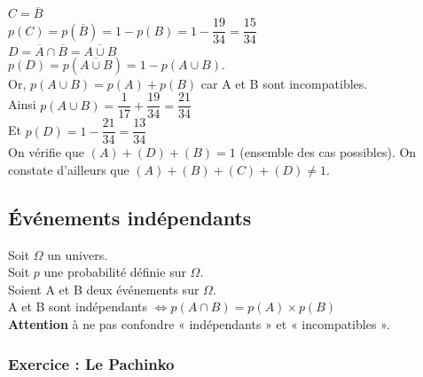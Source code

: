 $ C = \overline{B} $ \\

$ p\left(C\right) = p\left(\overline{B} \right) = 1 - p\left(B\right) = 1 - \dfrac{19}{34} = \dfrac{15}{34} $ \\

$ D = \overline{A} \cap \overline{B} = \overline{A \cup B} $ \\

$ p\left(D\right) = p\left(\overline{A\cup B}\right) = 1 - p\left(A\cup B\right)$.  \\

Or, $p\left(A\cup B\right) = p\left(A\right) + p\left(B\right) $ car A et B sont incompatibles. \\

Ainsi $p\left(A\cup B\right) = \dfrac{1}{17} + \dfrac{19}{34} = \dfrac{21}{34} $ \\

Et $p\left(D\right) = 1 - \dfrac{21}{34} = \dfrac{13}{34} $ \\

On vérifie que $\left(A\right) + \left(D\right) + \left(B\right) = 1$ (ensemble des cas possibles). On constate d'ailleurs que $\left(A\right) + \left(B\right) + \left(C\right) + \left(D\right) \neq 1 $.

\newpage

\subsection{Événements indépendants}

Soit $\Omega$ un univers. \\ Soit $p$ une probabilité définie sur $\Omega$. \\ Soient A et B deux événements sur $\Omega$. \\

A et B sont indépendants $ \Longleftrightarrow p\left(A \cap B \right) = p\left(A\right) \times p\left(B\right) $ \\

\textbf{Attention } à ne pas confondre « indépendants » et « incompatibles ». 

\subsubsection{Exercice : Le Pachinko}


